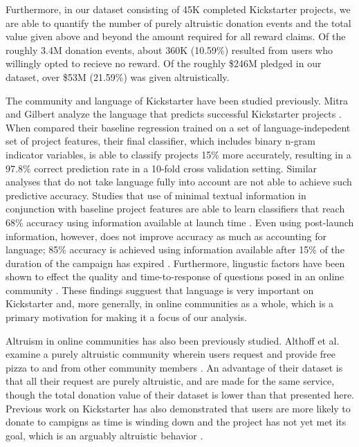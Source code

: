 \documentclass[letterpaper]{article}
\begin{document}
Furthermore, in our dataset consisting of 45K completed Kickstarter projects, we are able to quantify the number of purely altruistic donation events and the total value given above and beyond the amount required for all reward claims. Of the roughly 3.4M donation events, about 360K (10.59\%) resulted from users who willingly opted to recieve no reward. Of the roughly \$246M pledged in our dataset, over \$53M (21.59\%) was given altruistically.

The community and language of Kickstarter have been studied previously. Mitra and Gilbert analyze the language that predicts successful Kickstarter projects \cite{mitra2014language}. When compared their baseline regression trained on a set of language-indepedent set of project features, their final classifier, which includes binary n-gram indicator variables, is able to classify projects 15\% more accurately, resulting in a 97.8\% correct prediction rate in a 10-fold cross validation setting. Similar analyses that do not take language fully into account are not able to achieve such predictive accuracy. Studies that use of minimal textual information in conjunction with baseline project features are able to learn classifiers that reach 68\% accuracy using information available at launch time \cite{greenberg2013crowdfunding}. Even using post-launch information, however, does not improve accuracy as much as accounting for language; 85\% accuracy is achieved using information available after 15\% of the duration of the campaign has expired \cite{etter2013launch}. Furthermore, lingustic factors have been shown to effect the quality and time-to-response of questions posed in an online community \cite{teevan2011factors}. These findings sugguest that language is very important on Kickstarter and, more generally, in online communities as a whole, which is a primary motivation for making it a focus of our analysis.

Altruism in online communities has also been previously studied. Althoff et al. examine a purely altruistic community wherein users request and provide free pizza to and from other community members \cite{althoff2014ask}. An advantage of their dataset is that all their request are purely altruistic, and are made for the same service, though the total donation value of their dataset is lower than that presented here. Previous work on Kickstarter has also demonstrated that users are more likely to donate to campigns as time is winding down and the project has not yet met its goal, which is an arguably altruistic behavior \cite{kuppuswamy2013crowdfunding}.
\end{document}
